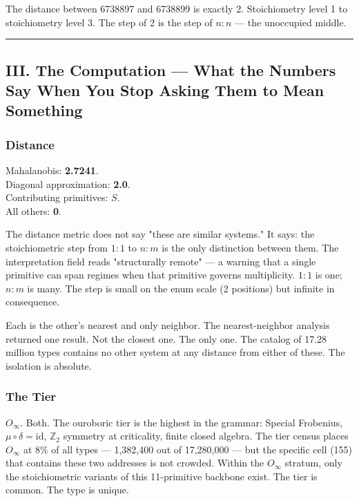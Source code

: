 \documentclass[12pt,a4paper]{article}
\begin{document}
The distance between 6738897 and 6738899 is exactly 2. Stoichiometry level 1 to stoichiometry level 3. The step of 2 is the step of $n{:}n$ --- the unoccupied middle.

\begin{center}
\rule{0.5\textwidth}{0.4pt}
\end{center}

\subsection{III. The Computation --- What the Numbers Say When You Stop Asking Them to Mean Something}

\subsubsection{Distance}

Mahalanobis: \textbf{2.7241}. \\
Diagonal approximation: \textbf{2.0}. \\
Contributing primitives: \textbf{$S$}. \\
All others: \textbf{0}.

The distance metric does not say "these are similar systems." It says: the stoichiometric step from $1{:}1$ to $n{:}m$ is the only distinction between them. The interpretation field reads "structurally remote" --- a warning that a single primitive can span regimes when that primitive governs multiplicity. $1{:}1$ is one; $n{:}m$ is many. The step is small on the enum scale (2 positions) but infinite in consequence.

Each is the other's nearest and only neighbor. The nearest-neighbor analysis returned one result. Not the closest one. The only one. The catalog of 17.28 million types contains no other system at any distance from either of these. The isolation is absolute.

\subsubsection{The Tier}

$O_{\infty}$. Both. The ouroboric tier is the highest in the grammar: Special Frobenius, $\mu \circ \delta = \text{id}$, $\mathbb{Z}_2$ symmetry at criticality, finite closed algebra. The tier census places $O_{\infty}$ at 8\% of all types --- 1,382,400 out of 17,280,000 --- but the specific cell (155) that contains these two addresses is not crowded. Within the $O_{\infty}$ stratum, only the stoichiometric variants of this 11-primitive backbone exist. The tier is common. The type is unique.
\end{document}
